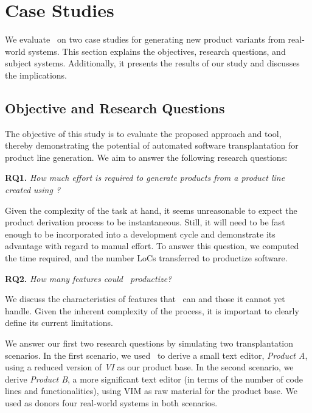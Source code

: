 \section{Case Studies} \label{sec:case_studies}
We evaluate \autoscalpel~on two case studies for generating new product variants from real-world systems. This section explains the objectives, research questions, and subject systems. Additionally, it presents the results of our study and discusses the implications.

\subsection{Objective and Research Questions}
The objective of this study is to evaluate the proposed approach and tool, thereby demonstrating the potential of automated software transplantation for product line generation. %
We aim to answer the following research questions:

\textbf{RQ1.} \emph{How much effort is required to generate products from a product line created using \autoscalpel?}

Given the complexity of the task at hand, it seems unreasonable to expect the product derivation process to be instantaneous. Still, it will need to be fast enough to be incorporated into a development cycle and demonstrate its advantage with regard to manual effort. To answer this question, we computed the time required, and the number LoCs transferred to productize software.

\textbf{RQ2.} \emph{How many features could \autoscalpel~productize?}

We discuss the characteristics of features that \autoscalpel~can and those it cannot yet handle. Given the inherent complexity of the process, it is important to clearly define its current limitations. 

We answer our first two research questions by simulating two transplantation scenarios. In the first scenario, we used \autoscalpel~to derive a small text editor, \emph{Product A}, using a reduced version of \emph{VI} as our product base. In the second scenario, we derive \emph{Product B}, a more significant text editor (in terms of the number of code lines and functionalities), using VIM as raw material for the product base. We used as donors four real-world systems in both scenarios.

